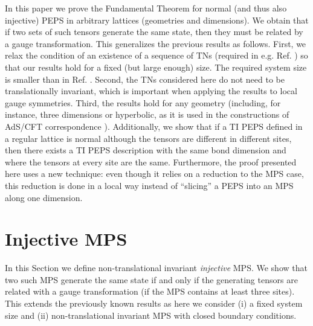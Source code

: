 \documentclass[preprint, superscriptaddress,a4paper,longbibliography]{revtex4-1}
\theoremstyle{definition}
\newcommand{\todo}[1]{{\color{red} \uppercase{#1}}}
\begin{document}


In this paper we prove the Fundamental Theorem for normal (and thus also injective) PEPS
in arbitrary lattices (geometries and dimensions). We obtain that if two sets of such tensors
generate the same state, then they must be related by a gauge transformation. This generalizes
the previous results as follows. First, we relax the condition of an existence of a sequence
of TNs (required in e.g. Ref. ) so that our results hold for a fixed (but large enough) size. The required system size is smaller than in Ref. . Second, the TNs considered
here do not need to be translationally invariant, which is important when applying the results
to local gauge symmetries. Third, the results hold for any geometry (including, for instance,
three dimensions or hyperbolic, as it is used in the constructions of AdS/CFT correspondence
\cite{Pastawski2015,Hayden2016}). Additionally, we show that if a TI PEPS defined in a regular lattice is normal although the tensors are different in different sites, then there exists a TI PEPS description with the same bond dimension and where the tensors at every site are the same.
Furthermore, the proof presented here uses a new technique: even though it relies on a reduction to the MPS case, this reduction is done in a local way instead of ``slicing'' a PEPS into an MPS along one dimension.


\section{Injective MPS}

In this Section we define non-translational invariant \emph{injective} MPS. We show that two such MPS generate the same state if and only if the generating tensors are related with a gauge transformation (if the MPS contains at least three sites). This extends the previously known results as here we consider (i) a fixed system size and (ii) non-translational invariant MPS with closed boundary conditions.
\end{document}
